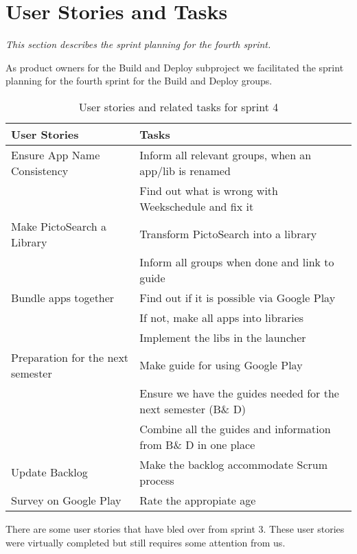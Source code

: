 \section{User Stories and Tasks} \label{Sprint4_SecUserStoriesAndTasks}
\textit{This section describes the sprint planning for the fourth sprint.}

As product owners for the Build and Deploy subproject we facilitated the sprint planning for the fourth sprint for the Build and Deploy groups.

\begin{table}
	\centering
	\begin{tabular}{ll}
		\textbf{User Stories} & \textbf{Tasks}\\ \hline \noalign{\vskip 2mm}
		Ensure App Name Consistency & Inform all relevant groups, when an app/lib is renamed\\ 
		& Find out what is wrong with Weekschedule and fix it\\ \hline
		Make PictoSearch a Library & Transform PictoSearch into a library\\
		& Inform all groups when done and link to guide\\ \hline
		Bundle apps together & Find out if it is possible via Google Play\\
		& If not, make all apps into libraries\\
		& Implement the libs in the launcher\\ \hline
		Preparation for the next semester & Make guide for using Google Play\\
		& Ensure we have the guides needed for the next semester (B\& D)\\
		& Combine all the guides and information from B\& D in one place\\ \hline
		Update Backlog & Make the backlog accommodate Scrum process\\ \hline
		Survey on Google Play & Rate the appropiate age\\ \hline
	\end{tabular}
	\caption{User stories and related tasks for sprint 4}
	\label{Sprint4_UserStories4_table}
\end{table}

There are some user stories that have bled over from sprint 3. These user stories were virtually completed but still requires some attention from us.\\